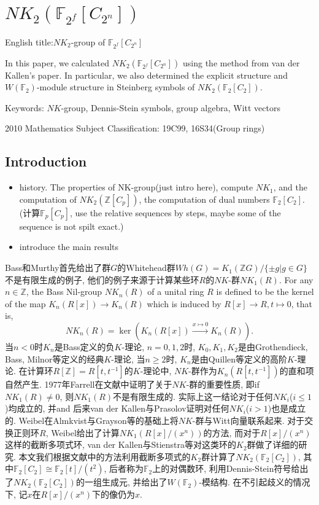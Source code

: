 \chapter{$NK_{2}(\mathbb{F}_{2^f}[C_{2^n}])$}
English title:$NK_2$-group of $\mathbb{F}_{2^f}[C_{2^n}]$

 In this paper, we calculated $NK_2(\mathbb{F}_{2^f}[C_{2^n}])$ using the method from van der Kallen's paper. In particular, we also determined the explicit structure and $W(\mathbb{F}_2)$-module structure in Steinberg symbols of $NK_2(\mathbb{F}_{2}[C_{2}])$.

Keywords: $NK$-group, Dennis-Stein symbols, group algebra, Witt vectors

2010 Mathematics Subject Classification: 19C99, 16S34(Group rings)


\section{Introduction}
\begin{itemize}
	\item history. The properties of NK-group(just intro here), compute $NK_1$, and the computation of $NK_2(\mathbb{Z}[C_p])$, the computation of dual numbers $\mathbb{F}_2[C_2]$. (计算$\mathbb{F}_p[C_p]$, use the relative sequences by steps, maybe some of the sequence is not spilt exact.)
	\item introduce the main results
\end{itemize}

Bass和Murthy\cite{MR36:2671}首先给出了群$G$的Whitehead群$Wh(G)=K_1(\mathbb{Z}G)/\{\pm g | g\in G\}$不是有限生成的例子, 他们的例子来源于计算某些环$R$的$NK$-群$NK_1(R)$. For any $n\in \mathbb{Z}$, the Bass Nil-group $NK_n(R)$ of a unital ring $R$ is defined to be the kernel of the map $K_n(R[x]) \longrightarrow K_n(R)$ which is induced by $R[x] \longrightarrow R, t \mapsto 0$, that is,
    \[NK_n(R)=\ker(K_n(R[x])\overset{x\mapsto 0}\longrightarrow K_n(R)).\]
    当$n<0$时$K_{n}$是Bass定义的负$K$-理论, $n=0,1,2$时, $K_0,K_1,K_2$是由Grothendieck, Bass, Milnor等定义的经典$K$-理论, 当$n\geq 2$时, $K_n$是由Quillen等定义的高阶$K$-理论. 在计算环$R[\mathbb{Z}]=R[t,t^{-1}]$的$K$-理论中, $NK$-群作为$K_n(R[t,t^{-1}])$的直和项自然产生. 1977年Farrell在文献\cite{MR56:8624}中证明了关于$NK$-群的重要性质, 即if $NK_1(R)\neq 0$, 则$NK_1(R)$不是有限生成的. 实际上这一结论对于任何$NK_i$($i\leq 1$)均成立的, 并and 后来van der Kallen\cite{MR81g:18017}与Prasolov\cite{MR83m:18013}证明对任何$NK_i$($i> 1$)也是成立的. Weibel\cite{MR82k:18010}在Almkvist\cite{MR55:5721}与Grayson\cite{MR81e:13014}等的基础上将$NK$-群与Witt向量联系起来. 对于交换正则环$R$, Weibel\cite{weibel2013k}给出了计算$NK_1(R[x]/(x^n))$的方法, 而对于$R[x]/(x^n)$这样的截断多项式环, van der Kallen\cite{MR45:252}\cite{MR86f:18017}与Stienstra\cite{MR82k:13016}等对这类环的$K_2$群做了详细的研究. 本文我们根据文献\cite{MR86f:18017}中的方法利用截断多项式的$K_2$群计算了$NK_2(\mathbb{F}_2[C_{2}])$, 其中$\mathbb{F}_2[C_{2}]\cong \mathbb{F}_2[t]/(t^2)$, 后者称为$\mathbb{F}_2$上的对偶数环, 利用Dennis-Stein符号给出了$NK_2(\mathbb{F}_2[C_{2}])$的一组生成元, 并给出了$W(\mathbb{F}_2)$-模结构. 在不引起歧义的情况下, 记$x$在$R[x]/(x^n)$下的像仍为$x$.


